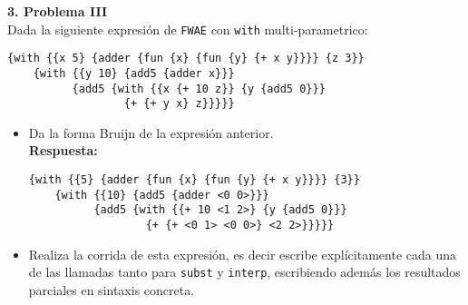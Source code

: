\documentclass[letterpaper,11pt]{article}
\begin{document}
 {\bf 3. Problema III}
 \\
Dada la siguiente expresión de \texttt{FWAE} con \verb;with; multi-parametrico:
\begin{verbatim}
{with {{x 5} {adder {fun {x} {fun {y} {+ x y}}}} {z 3}}
    {with {{y 10} {add5 {adder x}}}
          {add5 {with {{x {+ 10 z}} {y {add5 0}}}
                  {+ {+ y x} z}}}}}
\end{verbatim}
\begin{itemize}
\item Da la forma Bruijn de la expresión anterior.
\\
\textbf{Respuesta:} 
\begin{verbatim}
{with {{5} {adder {fun {x} {fun {y} {+ x y}}}} {3}}
    {with {{10} {add5 {adder <0 0>}}}
          {add5 {with {{+ 10 <1 2>} {y {add5 0}}}
                  {+ {+ <0 1> <0 0>} <2 2>}}}}}
\end{verbatim}
\item Realiza la corrida de esta expresión, es decir escribe explícitamente cada una de las llamadas tanto para \texttt{subst} y \texttt{interp}, escribiendo además los resultados parciales en sintaxis concreta.
\end{itemize}
\end{document}
